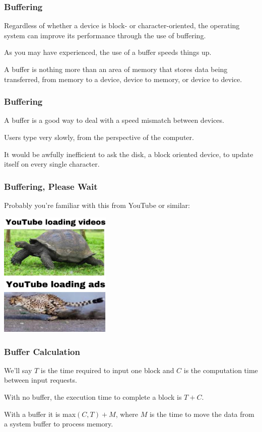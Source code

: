 \begin{frame}
\frametitle{Buffering}

Regardless of whether a device is block- or character-oriented, the operating system can improve its performance through the use of buffering. 

As you may have experienced, the use of a buffer speeds things up.

A buffer is nothing more than an area of memory that stores data being transferred, from memory to a device, device to memory, or device to device. 

\end{frame}


\begin{frame}
\frametitle{Buffering}

A buffer is a good way to deal with a speed mismatch between devices. 

Users type very slowly, from the perspective of the computer. 

It would be awfully inefficient to ask the disk, a block oriented device, to update itself on every single character. 

\end{frame}



\begin{frame}
\frametitle{Buffering, Please Wait}

Probably you're familiar with this from YouTube or similar:

\begin{center}
	\includegraphics[width=0.4\textwidth]{images/buffering.jpg}
\end{center}

\end{frame}


\begin{frame}
\frametitle{Buffer Calculation}

We'll say $T$ is the time required to input one block and $C$ is the computation time between input requests. 

With no buffer, the execution time to complete a block is $T+C$.

With a buffer it is max$(C, T) + M$, where $M$ is the time to move the data from a system buffer to process memory.


\end{frame}



